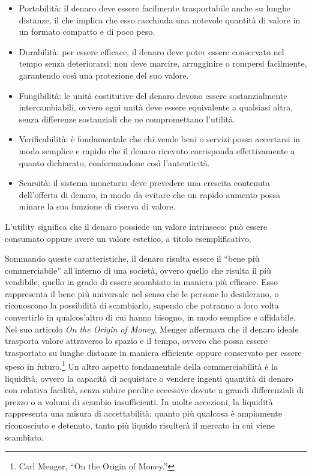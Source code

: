 \documentclass[
  a5paper,
  smalldemyvopaper,10pt,twoside,onecolumn,openright,extrafontsizes,hidelinks]{memoir}
\providecommand{\tightlist}{%
  \setlength{\itemsep}{0pt}\setlength{\parskip}{0pt}}\usepackage{longtable,booktabs,array}
\begin{document}
\begin{itemize}
\tightlist
\item
  Portabilità: il denaro deve essere facilmente trasportabile anche su
  lunghe distanze, il che implica che esso racchiuda una notevole
  quantità di valore in un formato compatto e di poco peso.
\item
  Durabilità: per essere efficace, il denaro deve poter essere
  conservato nel tempo senza deteriorarsi; non deve marcire, arrugginire
  o rompersi facilmente, garantendo così una protezione del suo valore.
\item
  Fungibilità: le unità costitutive del denaro devono essere
  sostanzialmente intercambiabili, ovvero ogni unità deve essere
  equivalente a qualsiasi altra, senza differenze sostanziali che ne
  compromettano l'utilità.
\item
  Verificabilità: è fondamentale che chi vende beni o servizi possa
  accertarsi in modo semplice e rapido che il denaro ricevuto
  corrisponda effettivamente a quanto dichiarato, confermandone così
  l'autenticità.
\item
  Scarsità: il sistema monetario deve prevedere una crescita contenuta
  dell'offerta di denaro, in modo da evitare che un rapido aumento possa
  minare la sua funzione di riserva di valore.
\end{itemize}

L'utility significa che il denaro possiede un valore intrinseco: può
essere consumato oppure avere un valore estetico, a titolo
esemplificativo.

Sommando queste caratteristiche, il denaro risulta essere il ``bene più
commerciabile'' all'interno di una società, ovvero quello che risulta il
più vendibile, quello in grado di essere scambiato in maniera più
efficace. Esso rappresenta il bene più universale nel senso che le
persone lo desiderano, o riconoscono la possibilità di scambiarlo,
sapendo che potranno a loro volta convertirlo in qualcos'altro di cui
hanno bisogno, in modo semplice e affidabile. Nel suo articolo \emph{On
the Origin of Money}, Menger affermava che il denaro ideale trasporta
valore attraverso lo spazio e il tempo, ovvero che possa essere
trasportato su lunghe distanze in maniera efficiente oppure conservato
per essere speso in futuro.\footnote{Carl Menger, ``On the Origin of
  Money.''} Un altro aspetto fondamentale della commerciabilità è la
liquidità, ovvero la capacità di acquistare o vendere ingenti quantità
di denaro con relativa facilità, senza subire perdite eccessive dovute a
grandi differenziali di prezzo o a volumi di scambio insufficienti. In
molte accezioni, la liquidità rappresenta una misura di accettabilità:
quanto più qualcosa è ampiamente riconosciuto e detenuto, tanto più
liquido risulterà il mercato in cui viene scambiato.
\end{document}
